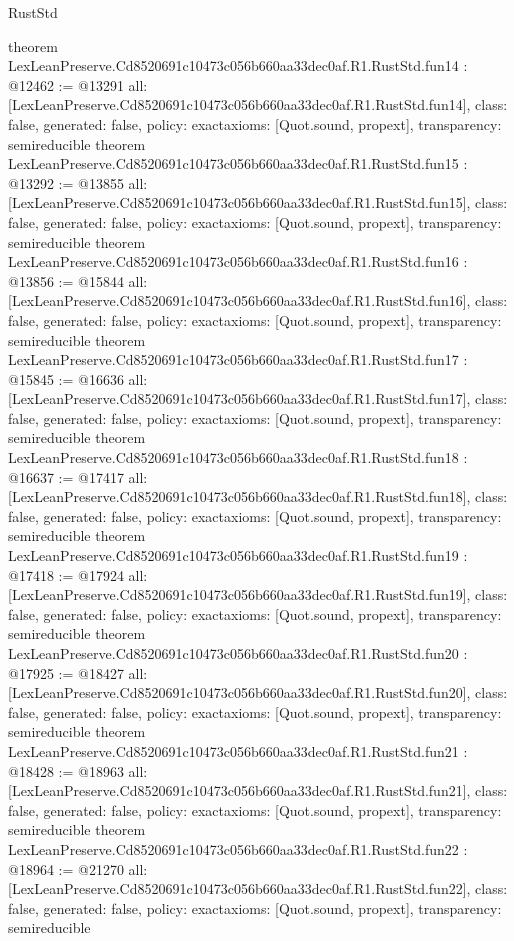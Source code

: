 \begin{lexlean}{RustStd}
\begin{coremodule}
{}
theorem LexLeanPreserve.Cd8520691c10473c056b660aa33dec0af.R1.RustStd.fun14 : @12462 := @13291 {
  all: [LexLeanPreserve.Cd8520691c10473c056b660aa33dec0af.R1.RustStd.fun14],
  class: false,
  generated: false,
  policy: exact{axioms: [Quot.sound, propext]},
  transparency: semireducible
}
theorem LexLeanPreserve.Cd8520691c10473c056b660aa33dec0af.R1.RustStd.fun15 : @13292 := @13855 {
  all: [LexLeanPreserve.Cd8520691c10473c056b660aa33dec0af.R1.RustStd.fun15],
  class: false,
  generated: false,
  policy: exact{axioms: [Quot.sound, propext]},
  transparency: semireducible
}
theorem LexLeanPreserve.Cd8520691c10473c056b660aa33dec0af.R1.RustStd.fun16 : @13856 := @15844 {
  all: [LexLeanPreserve.Cd8520691c10473c056b660aa33dec0af.R1.RustStd.fun16],
  class: false,
  generated: false,
  policy: exact{axioms: [Quot.sound, propext]},
  transparency: semireducible
}
theorem LexLeanPreserve.Cd8520691c10473c056b660aa33dec0af.R1.RustStd.fun17 : @15845 := @16636 {
  all: [LexLeanPreserve.Cd8520691c10473c056b660aa33dec0af.R1.RustStd.fun17],
  class: false,
  generated: false,
  policy: exact{axioms: [Quot.sound, propext]},
  transparency: semireducible
}
theorem LexLeanPreserve.Cd8520691c10473c056b660aa33dec0af.R1.RustStd.fun18 : @16637 := @17417 {
  all: [LexLeanPreserve.Cd8520691c10473c056b660aa33dec0af.R1.RustStd.fun18],
  class: false,
  generated: false,
  policy: exact{axioms: [Quot.sound, propext]},
  transparency: semireducible
}
theorem LexLeanPreserve.Cd8520691c10473c056b660aa33dec0af.R1.RustStd.fun19 : @17418 := @17924 {
  all: [LexLeanPreserve.Cd8520691c10473c056b660aa33dec0af.R1.RustStd.fun19],
  class: false,
  generated: false,
  policy: exact{axioms: [Quot.sound, propext]},
  transparency: semireducible
}
theorem LexLeanPreserve.Cd8520691c10473c056b660aa33dec0af.R1.RustStd.fun20 : @17925 := @18427 {
  all: [LexLeanPreserve.Cd8520691c10473c056b660aa33dec0af.R1.RustStd.fun20],
  class: false,
  generated: false,
  policy: exact{axioms: [Quot.sound, propext]},
  transparency: semireducible
}
theorem LexLeanPreserve.Cd8520691c10473c056b660aa33dec0af.R1.RustStd.fun21 : @18428 := @18963 {
  all: [LexLeanPreserve.Cd8520691c10473c056b660aa33dec0af.R1.RustStd.fun21],
  class: false,
  generated: false,
  policy: exact{axioms: [Quot.sound, propext]},
  transparency: semireducible
}
theorem LexLeanPreserve.Cd8520691c10473c056b660aa33dec0af.R1.RustStd.fun22 : @18964 := @21270 {
  all: [LexLeanPreserve.Cd8520691c10473c056b660aa33dec0af.R1.RustStd.fun22],
  class: false,
  generated: false,
  policy: exact{axioms: [Quot.sound, propext]},
  transparency: semireducible
}
\end{coremodule}
\end{lexlean}
